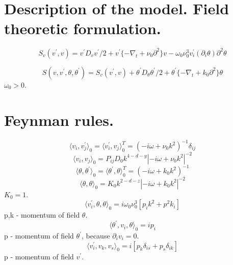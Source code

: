 \documentclass[12pt]{article}
\begin{document}

\section{Description of the model. Field theoretic formulation.}
\label{sec:QFT}

\begin{equation}
S_{v}(v^{'},v) = v^{'}D_{v}v^{'}/2+v^{'}\{-\nabla_{t}+\nu_{0}\partial^2\}v-\omega_{0}\nu_{0}^{3}v^{'}_{i}(\partial_{i}\theta)\partial^{2}\theta
\end{equation}

\begin{equation}
S(v,v^{'},\theta,\theta^{'}) = S_{v}(v^{'},v)+\theta^{'}D_{\theta}\theta^{'}/2+\theta^{'}\{-\nabla_{t}+k_{0}\partial^{2}\}\theta
\end{equation}
$\omega_{0}>0$.
\section{Feynman rules.}
\begin{equation}
\langle v_{i},v^{'}_{j} \rangle_{0}=\langle v^{'}_{i},v_{j} \rangle _{0}^{T}=(-i\omega+\nu_{0}k^2)^{-1}\delta_{ij}
\end{equation}
\begin{equation}
\langle v_{i},v_{j} \rangle_{0}=P_{ij}D_{0}k^{4-d-y}|-i\omega+\nu_{0}k^2|^{-2}
\end{equation}
\begin{equation}
\langle \theta,\theta^{'} \rangle_{0}=\langle \theta^{'},\theta \rangle _{0}^{T}=(-i\omega+k_{0}k^2)^{-1}
\end{equation}
\begin{equation}
\langle \theta,\theta \rangle_{0}=K_{0}k^{2-d-z}|-i\omega+k_{0}k^2|^{-2}
\end{equation}
$K_{0}=1$.
\begin{equation}
    \langle v_{i}^{'}, \theta,\theta \rangle_{0}= i\omega_{0}\nu_{0}^{3}[p_i k^2+p^2 k_i]
\end{equation}
p,k - momentum of field $\theta$.
\begin{equation}
\langle \theta^{'}, v_i ,\theta \rangle_{0}= ip_i
\end{equation}
p - momentum of field $\theta^{'}$, because $\partial_i v_i=0$.
\begin{equation}
\langle v^{'}_i, v_k ,v_s \rangle_{0}= i[p_k \delta_{is}+ p_s \delta_{ik}]
\end{equation}
p - momentum of field $v^{'}$.
\end{document}
